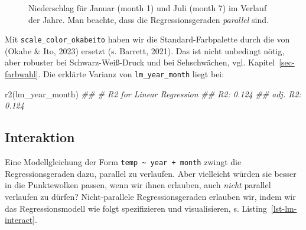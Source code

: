 \documentclass[
  letterpaper,
  oneside,
  open=any]{scrbook}
\newenvironment{Shaded}{\begin{snugshade}}{\end{snugshade}}
\newcommand{\DocumentationTok}[1]{\textcolor[rgb]{0.37,0.37,0.37}{\textit{#1}}}
\newcommand{\FunctionTok}[1]{\textcolor[rgb]{0.28,0.35,0.67}{#1}}
\newcommand{\NormalTok}[1]{\textcolor[rgb]{0.00,0.23,0.31}{#1}}
\theoremstyle{definition}
\theoremstyle{definition}
\theoremstyle{definition}
\theoremstyle{remark}
\begin{document}
\begin{figure}


\caption{\label{fig-lm3}Niederschlag für Januar (month 1) und Juli
(month 7) im Verlauf der Jahre. Man beachte, dass die Regressionsgeraden
\emph{parallel} sind.}

\end{figure}%

Mit \texttt{scale\_color\_okabeito} haben wir die Standard-Farbpalette
durch die von (Okabe \& Ito, 2023) ersetzt (s. Barrett, 2021). Das ist
nicht unbedingt nötig, aber robuster bei Schwarz-Weiß-Druck und bei
Sehschwächen, vgl. Kapitel~\ref{sec-farbwahl}. Die erklärte Varianz von
\texttt{lm\_year\_month} liegt bei:

\begin{Shaded}
\begin{Highlighting}[]
\FunctionTok{r2}\NormalTok{(lm\_year\_month)}
\DocumentationTok{\#\# \# R2 for Linear Regression}
\DocumentationTok{\#\#        R2: 0.124}
\DocumentationTok{\#\#   adj. R2: 0.124}
\end{Highlighting}
\end{Shaded}

\subsection{Interaktion}\label{interaktion}

Eine Modellgleichung der Form
\texttt{temp\ \textasciitilde{}\ year\ +\ month} zwingt die
Regressionsgeraden dazu, parallel zu verlaufen. Aber vielleicht würden
sie besser in die Punktewolken passen, wenn wir ihnen erlauben, auch
\emph{nicht} parallel verlaufen zu dürfen? Nicht-parallele
Regressionsgeraden erlauben wir, indem wir das Regressionsmodell wie
folgt spezifizieren und visualisieren, s. Listing~\ref{lst-lm-interact}.
\end{document}
